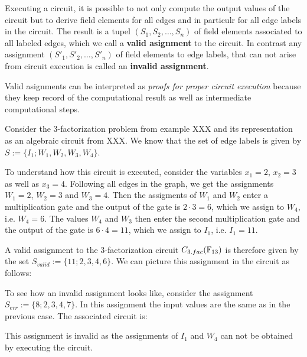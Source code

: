 Executing a circuit, it is possible to not only compute the output values of the circuit but to derive field elements for all edges and in particulr for all edge labels in the circuit. The result is a tupel $(S_1,S_2,\ldots, S_n)$ of field elements associated to all labeled edges, which we call a \textbf{valid asignment} to the circuit. In contrast any assignment $(S'_1,S'_2,\ldots, S'_n)$ of field elements to edge labels, that can not arise from circuit execution is called an \textbf{invalid assignment}.

Valid asignments can be interpreted as \textit{proofs for proper circuit execution} because they keep record of the computational result as well as intermediate computational steps. 
\begin{example}[3-factorization] Consider the $3$-factorization problem from example XXX and its representation as an algebraic circuit from XXX. We know that the set of edge labels is given by $S:=\{I_{1};W_{1},W_{2},W_{3}, W_{4}\}$. 

To understand how this circuit is executed, consider the variables $x_1=2$, $x_2=3$ as well as $x_3=4$. Following all edges in the graph, we get the assignments $W_1=2$, $W_2=3$ and $W_3=4$. Then the assigments of $W_1$ and $W_2$ enter a multiplication gate and the output of the gate is $2\cdot 3 = 6$, which we assign to $W_4$, i.e. $W_4=6$. The values $W_4$ and $W_3$ then enter the second multiplication gate and the output of the gate is $6\cdot 4 = 11$, which we assign to $I_1$, i.e. $I_1=11$. 

A valid assignment to the 3-factorization circuit $C_{3.fac}(\mathbb{F}_{13})$ is therefore given by the set $S_{valid}:=\{11;2,3,4,6\}$. We can picture this assignment in the circuit as follows:
\begin{center}
\end{center}
To see how an invalid assignment looks like, consider the assignment $S_{err}:=\{8;2,3,4,7\}$. In this assignment the input values are the same as in the previous case. The associated circuit is:
\begin{center}
\end{center}
This assignment is invalid as the assignments of $I_1$ and $W_4$ can not be obtained by executing the circuit.
\end{example}
